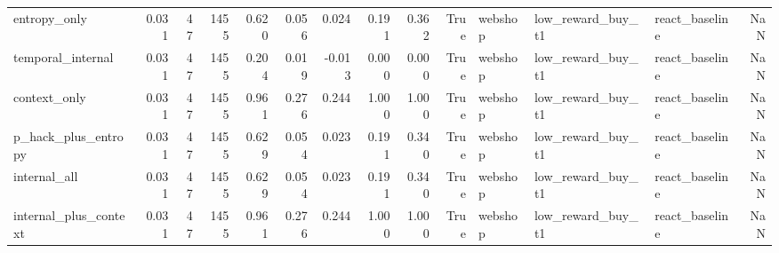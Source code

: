 \begin{tabular}{lrrrrrrrrrlllr}
entropy_only & 0.031 & 47 & 1455 & 0.620 & 0.056 & 0.024 & 0.191 & 0.362 & True & webshop & low_reward_buy_t1 & react_baseline & NaN \\
temporal_internal & 0.031 & 47 & 1455 & 0.204 & 0.019 & -0.013 & 0.000 & 0.000 & True & webshop & low_reward_buy_t1 & react_baseline & NaN \\
context_only & 0.031 & 47 & 1455 & 0.961 & 0.276 & 0.244 & 1.000 & 1.000 & True & webshop & low_reward_buy_t1 & react_baseline & NaN \\
p_hack_plus_entropy & 0.031 & 47 & 1455 & 0.629 & 0.054 & 0.023 & 0.191 & 0.340 & True & webshop & low_reward_buy_t1 & react_baseline & NaN \\
internal_all & 0.031 & 47 & 1455 & 0.629 & 0.054 & 0.023 & 0.191 & 0.340 & True & webshop & low_reward_buy_t1 & react_baseline & NaN \\
internal_plus_context & 0.031 & 47 & 1455 & 0.961 & 0.276 & 0.244 & 1.000 & 1.000 & True & webshop & low_reward_buy_t1 & react_baseline & NaN \\
\bottomrule
\end{tabular}
